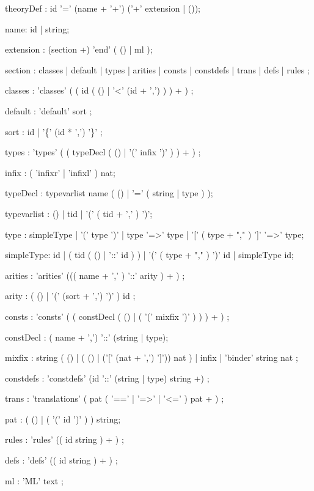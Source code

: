 \begin{rail}

theoryDef : id '=' (name + '+') ('+' extension | ());

name: id | string;

extension : (section +) 'end' ( () | ml );

section : classes
        | default
        | types
        | arities
        | consts
        | constdefs
        | trans
        | defs
        | rules
        ;

classes : 'classes' ( ( id (  ()
                            | '<' (id + ',')
                           ) 
                       ) + )
        ;

default : 'default' sort 
        ;

sort :  id
     | '\{' (id * ',') '\}'
     ;

types : 'types' ( ( typeDecl ( () | '(' infix ')' ) ) + )
      ;

infix : ( 'infixr' | 'infixl' ) nat;

typeDecl : typevarlist name
           ( () | '=' ( string | type ) );

typevarlist : () | tid | '(' ( tid + ',' ) ')';

type : simpleType | '(' type ')' | type '=>' type |
       '[' ( type + "," ) ']' '=>' type;

simpleType: id | ( tid ( () | '::' id ) ) |
            '(' ( type + "," ) ')' id | simpleType id;


arities : 'arities' ((( name + ',' ) '::' arity ) + )
        ;

arity   : ( () 
          | '(' (sort + ',') ')' 
          ) id
        ;


consts : 'consts' ( ( constDecl ( () | ( '(' mixfix ')' ) ) ) + )
       ;

constDecl : ( name + ',') '::' (string | type);

mixfix :  string ( () | ( () | ('[' (nat + ',') ']')) nat )
       | infix
       | 'binder' string nat ;

constdefs : 'constdefs' (id '::' (string | type) string +)
          ;

trans : 'translations' ( pat ( '==' | '=>' | '<=' ) pat + )
      ;

pat : ( () | ( '(' id ')' ) ) string;

rules : 'rules' (( id string ) + )
      ;

defs : 'defs' (( id string ) + )
     ;

ml : 'ML' text
   ;

\end{rail}
